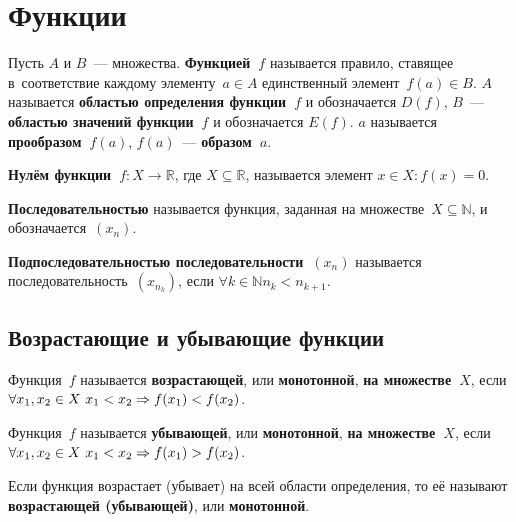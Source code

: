 \section{Функции}
 Пусть $A$ и $B$~--- множества.
\textbf{Функцией~$f$} называется правило, ставящее в~соответствие каждому элементу~$a \in A$ единственный элемент~$f(a) \in B$.
$A$ называется \textbf{областью определения функции~$f$} и обозначается $D(f)$, $B$~--- \textbf{областью значений функции~$f$} и обозначается $E(f)$.
$a$ называется \textbf{прообразом~$f(a)$}, $f(a)$~--- \textbf{образом~$a$}.

\textbf{Нулём функции~$f \colon X \to \mathbb R$}, где $X \subseteq \mathbb R$, называется элемент $x \in X \colon f(x) = 0$.

 \textbf{Последовательностью} называется функция, заданная на множестве~$X \subseteq \mathbb N$, и обозначается~$(x_n)$.

\textbf{Подпоследовательностью последовательности~$(x_n)$} называется последовательность~$(x_{n_k})$, если $\forall k \in \mathbb N \allowbreak n_k < n_{k+1}$.

\subsection{Возрастающие и убывающие функции}
 Функция~$f$ называется \textbf{возрастающей}, или \textbf{монотонной}, \textbf{на множестве~$X$}, если $\forall x_1, x_2 \in X \ x_1 < x_2 \opbr\Rightarrow f(x_1) < f(x_2)$.

 Функция~$f$ называется \textbf{убывающей}, или \textbf{монотонной}, \textbf{на множестве~$X$}, если $\forall x_1, x_2 \in X \ x_1 < x_2 \opbr\Rightarrow f(x_1) > \nobreak f(x_2)$.

Если функция возрастает (убывает) на всей области определения, то её называют \textbf{возрастающей (убывающей)}, или \textbf{монотонной}.

